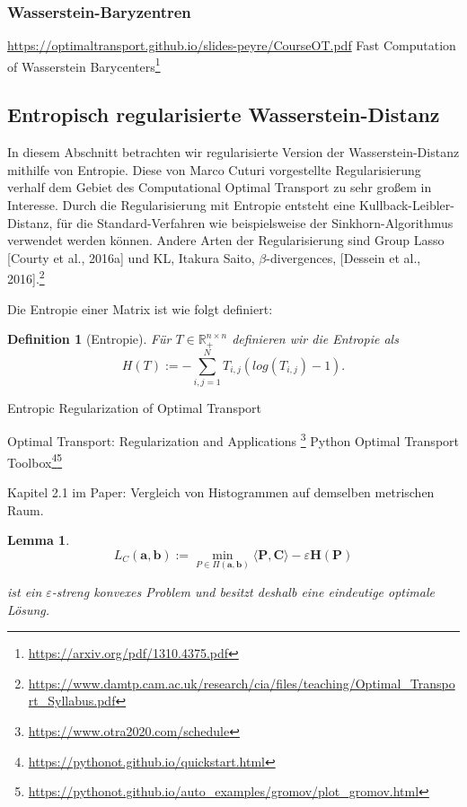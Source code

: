 \documentclass[11pt,a4paper]{article}
\newtheorem{lemma}[theorem]{Lemma}
\newtheorem{definition}[theorem]{Definition}
\numberwithin{equation}{section}
\begin{document}
	\subsubsection{Wasserstein-Baryzentren}
	\cite{bary_wasserstein_space}
	\url{https://optimaltransport.github.io/slides-peyre/CourseOT.pdf}
		Fast Computation of Wasserstein Barycenters\footnote{\url{https://arxiv.org/pdf/1310.4375.pdf}}
	
	\subsection{Entropisch regularisierte Wasserstein-Distanz}
	In diesem Abschnitt betrachten wir regularisierte Version der Wasserstein-Distanz mithilfe von Entropie. 
	Diese von Marco Cuturi vorgestellte Regularisierung \cite{cuturi2013sinkhorn} verhalf dem Gebiet des Computational Optimal Transport zu sehr großem in Interesse. Durch die Regularisierung mit Entropie entsteht eine Kullback-Leibler-Distanz, für die Standard-Verfahren wie beispielsweise der Sinkhorn-Algorithmus verwendet werden können.
	Andere Arten der Regularisierung sind Group Lasso [Courty et al., 2016a] und KL, Itakura Saito, $\beta$-divergences,
	[Dessein et al., 2016].\footnote{\url{https://www.damtp.cam.ac.uk/research/cia/files/teaching/Optimal_Transport_Syllabus.pdf}}
	
 	Die Entropie einer Matrix ist wie folgt definiert:
 	
	\begin{definition}[Entropie]
		Für $T \in \mathbb{R}_{+}^{n \times n}$ definieren wir die Entropie als
		\begin{equation}
		H(T) := - \sum_{i,j=1}^N{T_{i,j}(log(T_{i,j})-1)}.
		\end{equation}
	\end{definition}
	Entropic Regularization of Optimal Transport \cite{computationalOT}
	
	
	Optimal Transport: Regularization and Applications
	\footnote{\url{https://www.otra2020.com/schedule}}
	Python Optimal Transport Toolbox\footnote{\url{https://pythonot.github.io/quickstart.html}}\footnote{\url{https://pythonot.github.io/auto_examples/gromov/plot_gromov.html}}
	
	Kapitel 2.1 im Paper: Vergleich von Histogrammen auf demselben metrischen Raum.
	
	\begin{lemma}
		\begin{equation}
			L_C(\boldsymbol{a}, \boldsymbol{b}):= \min_{P \in \Pi(\boldsymbol{a}, \boldsymbol{b})}{\langle \boldsymbol{P}, \boldsymbol{C} \rangle - \varepsilon \boldsymbol{H}(\boldsymbol{P})}\label{eq:reg_problem}	
		\end{equation}
	
		
		ist ein $\varepsilon$-streng konvexes Problem und besitzt deshalb eine eindeutige optimale Lösung.
		
	\end{lemma}
	
\end{document}
